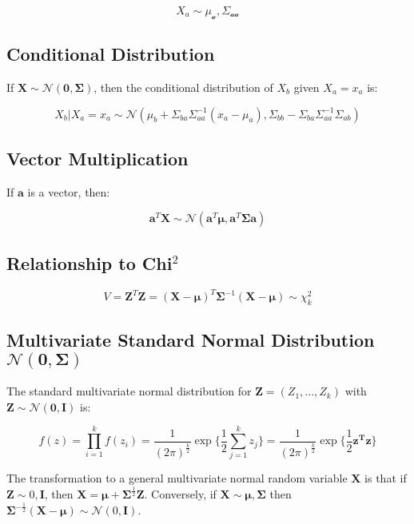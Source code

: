\begin{equation}
X_a \sim \mathscr{\mu_a,\Sigma_{aa}}
\end{equation}


\subsection{Conditional Distribution}
If $\mathbf{X} \sim \mathscr{N}(\mathbf{0},\mathbf{\Sigma})$, then the conditional distribution of $X_b$ given $X_a = x_a$ is:

\begin{equation}
X_b|X_a = x_a \sim \mathscr{N}(\mu_b + \Sigma_{ba}\Sigma_{aa}^{-1}(x_a - \mu_a), \Sigma_{bb}-\Sigma_{ba}\Sigma_{aa}^{-1}\Sigma_{ab}) 
\end{equation}


\subsection{Vector Multiplication}
If $\mathbf{a}$ is a vector, then:

\begin{equation}
\mathbf{a}^T \mathbf{X} \sim \mathscr{N}(\mathbf{a}^T \mathbf{\mu}, \mathbf{a}^T\mathbf{\Sigma}\mathbf{a})
\end{equation}


\subsection{Relationship to Chi$^2$}
\begin{equation}
V = \mathbf{Z}^T\mathbf{Z} = (\mathbf{X}-\mathbf{\mu})^T\mathbf{\Sigma}^{-1}(\mathbf{X}-\mathbf{\mu}) \sim \chi^2_k
\end{equation}

\subsection{Multivariate Standard Normal Distribution $\mathscr{N}(\mathbf{0},\mathbf{\Sigma})$}
The standard multivariate normal distribution for $\mathbf{Z} = (Z_1,...,Z_k)$ with $\mathbf{Z} \sim \mathscr{N}(\mathbf{0},\mathbf{I})$ is:

\begin{equation}
f(z) = \prod^k_{i=1} f(z_i) = \frac{1}{(2\pi)^{\frac{k}{2}}}\exp \{ \frac{1}{2} \sum^{k}_{j=1} z_j\} = \frac{1}{(2\pi)^{\frac{k}{2}}}\exp \{ \frac{1}{2} \mathbf{z^T z}\}
\end{equation}

The transformation to a general multivariate normal random variable $\mathbf{X}$ is that if $\mathbf{Z} \sim \mathscr{0,\mathbf{I}}$, then $\mathbf{X} = \mathbf{\mu} + \mathbf{\Sigma}^{\frac{1}{2}}\mathbf{Z}$. Conversely, if $\mathbf{X}\sim \mathscr{\mathbf{\mu},\mathbf{\Sigma}}$ then $\mathbf{\Sigma}^{-\frac{1}{2}}(\mathbf{X}-\mathbf{\mu}) \sim \mathscr{N}(0,\mathbf{I})$.
